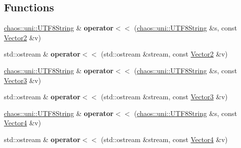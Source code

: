 \subsection*{Functions}
\begin{DoxyCompactItemize}
\item 
\hypertarget{namespacechaos_1_1gfx_a1de33c2369485b21d55cb0b17551c175}{}\hyperlink{classchaos_1_1uni_1_1_u_t_f8_string}{chaos\+::uni\+::\+U\+T\+F8\+String} \& {\bfseries operator$<$$<$} (\hyperlink{classchaos_1_1uni_1_1_u_t_f8_string}{chaos\+::uni\+::\+U\+T\+F8\+String} \&s, const \hyperlink{classchaos_1_1gfx_1_1_vector2}{Vector2} \&v)\label{namespacechaos_1_1gfx_a1de33c2369485b21d55cb0b17551c175}

\item 
\hypertarget{namespacechaos_1_1gfx_ab0c024010ee012b4c4083a5457f44fe9}{}std\+::ostream \& {\bfseries operator$<$$<$} (std\+::ostream \&stream, const \hyperlink{classchaos_1_1gfx_1_1_vector2}{Vector2} \&v)\label{namespacechaos_1_1gfx_ab0c024010ee012b4c4083a5457f44fe9}

\item 
\hypertarget{namespacechaos_1_1gfx_a5479948e624623b581c0285c150eb53d}{}\hyperlink{classchaos_1_1uni_1_1_u_t_f8_string}{chaos\+::uni\+::\+U\+T\+F8\+String} \& {\bfseries operator$<$$<$} (\hyperlink{classchaos_1_1uni_1_1_u_t_f8_string}{chaos\+::uni\+::\+U\+T\+F8\+String} \&s, const \hyperlink{classchaos_1_1gfx_1_1_vector3}{Vector3} \&v)\label{namespacechaos_1_1gfx_a5479948e624623b581c0285c150eb53d}

\item 
\hypertarget{namespacechaos_1_1gfx_a05bd520f9a9d1749435f253c2ef3eeb0}{}std\+::ostream \& {\bfseries operator$<$$<$} (std\+::ostream \&stream, const \hyperlink{classchaos_1_1gfx_1_1_vector3}{Vector3} \&v)\label{namespacechaos_1_1gfx_a05bd520f9a9d1749435f253c2ef3eeb0}

\item 
\hypertarget{namespacechaos_1_1gfx_a64b66c65748de4785cef34e1a2726808}{}\hyperlink{classchaos_1_1uni_1_1_u_t_f8_string}{chaos\+::uni\+::\+U\+T\+F8\+String} \& {\bfseries operator$<$$<$} (\hyperlink{classchaos_1_1uni_1_1_u_t_f8_string}{chaos\+::uni\+::\+U\+T\+F8\+String} \&s, const \hyperlink{classchaos_1_1gfx_1_1_vector4}{Vector4} \&v)\label{namespacechaos_1_1gfx_a64b66c65748de4785cef34e1a2726808}

\item 
\hypertarget{namespacechaos_1_1gfx_a573c92de32be52fd7444d574e5dd361f}{}std\+::ostream \& {\bfseries operator$<$$<$} (std\+::ostream \&stream, const \hyperlink{classchaos_1_1gfx_1_1_vector4}{Vector4} \&v)\label{namespacechaos_1_1gfx_a573c92de32be52fd7444d574e5dd361f}


\end{DoxyCompactItemize}
